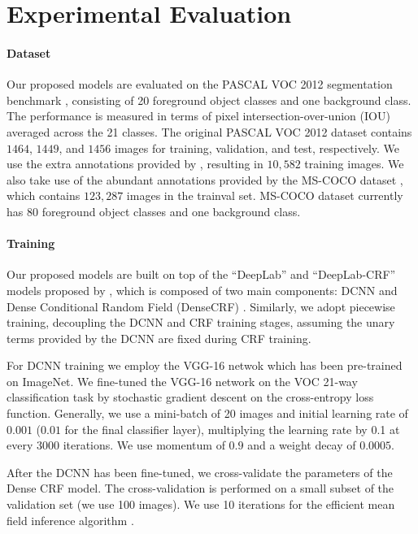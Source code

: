 \section{Experimental Evaluation}
\paragraph{Dataset} Our proposed models are evaluated on the PASCAL VOC 2012 segmentation benchmark \citep{everingham2014pascal}, consisting of 20 foreground object classes and one background class. The performance is measured in terms of pixel intersection-over-union (IOU) averaged across the 21 classes. The original PASCAL VOC 2012 dataset contains $1464$, $1449$, and $1456$ images for training, validation, and test, respectively. We use the extra annotations provided by \citet{hariharan2011semantic}, resulting in $10,582$ training images. We also take use of the abundant annotations provided by the MS-COCO dataset \citep{lin2014microsoft}, which contains $123,287$ images in the trainval set. MS-COCO dataset currently has $80$ foreground object classes and one background class.

\paragraph{Training} Our proposed models are built on top of the ``DeepLab'' and ``DeepLab-CRF'' models proposed by \citep{chen2014semantic}, which is composed of two main components: DCNN and Dense Conditional Random Field (DenseCRF) \citep{krahenbuhl2011efficient}. Similarly, we adopt piecewise training, decoupling the DCNN and CRF training stages, assuming the unary terms provided by the DCNN are fixed during CRF training. 

For DCNN training we employ the VGG-16 netwok which has been pre-trained on ImageNet. We fine-tuned the VGG-16 network on the VOC 21-way classification task by stochastic gradient descent on the cross-entropy loss function. Generally, we use a mini-batch of 20 images and initial learning rate of $0.001$ ($0.01$ for the final classifier layer), multiplying the learning rate by 0.1 at every 3000 iterations. We use momentum of $0.9$ and a weight decay of $0.0005$.

After the DCNN has been fine-tuned, we cross-validate the parameters of the Dense CRF model. The cross-validation is performed on a small subset of the validation set (we use 100 images). We use 10 iterations for the efficient mean field inference algorithm \citep{krahenbuhl2011efficient}.

